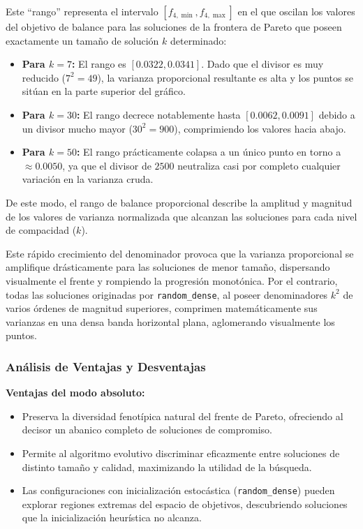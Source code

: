 \documentclass[a4paper,10pt]{article}
\begin{document}
Este ``rango'' representa el intervalo $[f_{4,\min}, f_{4,\max}]$ en el que oscilan los valores del objetivo de balance para las soluciones de la frontera de Pareto que poseen exactamente un tamaño de solución $k$ determinado:
\begin{itemize}
    \item \textbf{Para $k = 7$:} El rango es $[0.0322, 0.0341]$. Dado que el divisor es muy reducido ($7^2 = 49$), la varianza proporcional resultante es alta y los puntos se sitúan en la parte superior del gráfico.
    \item \textbf{Para $k = 30$:} El rango decrece notablemente hasta $[0.0062, 0.0091]$ debido a un divisor mucho mayor ($30^2 = 900$), comprimiendo los valores hacia abajo.
    \item \textbf{Para $k = 50$:} El rango prácticamente colapsa a un único punto en torno a $\approx 0.0050$, ya que el divisor de $2500$ neutraliza casi por completo cualquier variación en la varianza cruda.
\end{itemize}
De este modo, el rango de balance proporcional describe la amplitud y magnitud de los valores de varianza normalizada que alcanzan las soluciones para cada nivel de compacidad ($k$).

Este rápido crecimiento del denominador provoca que la varianza proporcional se amplifique drásticamente para las soluciones de menor tamaño, dispersando visualmente el frente y rompiendo la progresión monotónica. Por el contrario, todas las soluciones originadas por \texttt{random\_dense}, al poseer denominadores $k^2$ de varios órdenes de magnitud superiores, comprimen matemáticamente sus varianzas en una densa banda horizontal plana, aglomerando visualmente los puntos.

\subsubsection{Análisis de Ventajas y Desventajas}

\textbf{Ventajas del modo absoluto:}
\begin{itemize}
    \item Preserva la diversidad fenotípica natural del frente de Pareto, ofreciendo al decisor un abanico completo de soluciones de compromiso.
    \item Permite al algoritmo evolutivo discriminar eficazmente entre soluciones de distinto tamaño y calidad, maximizando la utilidad de la búsqueda.
    \item Las configuraciones con inicialización estocástica (\texttt{random\_dense}) pueden explorar regiones extremas del espacio de objetivos, descubriendo soluciones que la inicialización heurística no alcanza.
\end{itemize}
\end{document}
